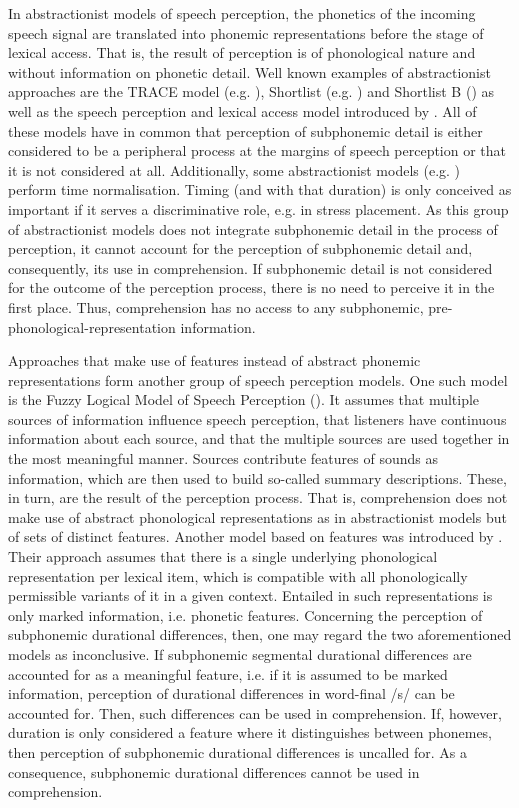 In abstractionist models of speech perception, the phonetics of the incoming speech signal are translated into phonemic representations before the stage of lexical access. That is, the result of perception is of phonological nature and without information on phonetic detail. Well known examples of abstractionist approaches are the TRACE model (e.g. \cite{McClelland1986}), Shortlist (e.g. \cite{Norris1994}) and Shortlist B (\cite{Norris2008}) as well as the speech perception and lexical access model introduced by \citet{Klatt1979}. All of these models have in common that perception of subphonemic detail is either considered to be a peripheral process at the margins of speech perception or that it is not considered at all. Additionally, some abstractionist models (e.g. \cite{Klatt1979}) perform time normalisation. Timing (and with that duration) is only conceived as important if it serves a discriminative role, e.g. in stress placement. As this group of abstractionist models does not integrate subphonemic detail in the process of perception, it cannot account for the perception of subphonemic detail and, consequently, its use in comprehension. If subphonemic detail is not considered for the outcome of the perception process, there is no need to perceive it in the first place. Thus, comprehension has no access to any subphonemic, pre-phonological-representation information.

Approaches that make use of features instead of abstract phonemic representations form another group of speech perception models. One such model is the Fuzzy Logical Model of Speech Perception (\cite{Massaro1987}). It assumes that multiple sources of information influence speech perception, that listeners have continuous information about each source, and that the multiple sources are used together in the most meaningful manner. Sources contribute features of sounds as information, which are then used to build so-called summary descriptions. These, in turn, are the result of the perception process. That is, comprehension does not make use of abstract phonological representations as in abstractionist models but of sets of distinct features. Another model based on features was introduced by \citet{Lahiri1991}. Their approach assumes that there is a single underlying phonological representation per lexical item, which is compatible with all phonologically permissible variants of it in a given context. Entailed in such representations is only marked information, i.e. phonetic features. Concerning the perception of subphonemic durational differences, then, one may regard the two aforementioned models as inconclusive. If subphonemic segmental durational differences are accounted for as a meaningful feature, i.e. if it is assumed to be marked information, perception of durational differences in word-final /s/ can be accounted for. Then, such differences can be used in comprehension. If, however, duration is only considered a feature where it distinguishes between phonemes, then perception of subphonemic durational differences is uncalled for. As a consequence, subphonemic durational differences cannot be used in comprehension.

